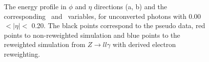 \begin{figure}[htbp]
	\begin{tcolorbox}[colback=black!5!white,colframe=white!75!black]
    \caption{The energy profile in $\phi$ and $\eta$ directions (a, b) and the corresponding \Rphi \ and \Reta \ variables, for unconverted photons with 0.00 $ < |\eta| < $ 0.20. The black points correspond to the pseudo data, red points to non-reweighted simulation and blue points to the reweighted simulation from $Z\rightarrow ll\gamma$ with derived electron reweighting.}
    \label{Electron:1}
    \end{tcolorbox}
    
\end{figure}

